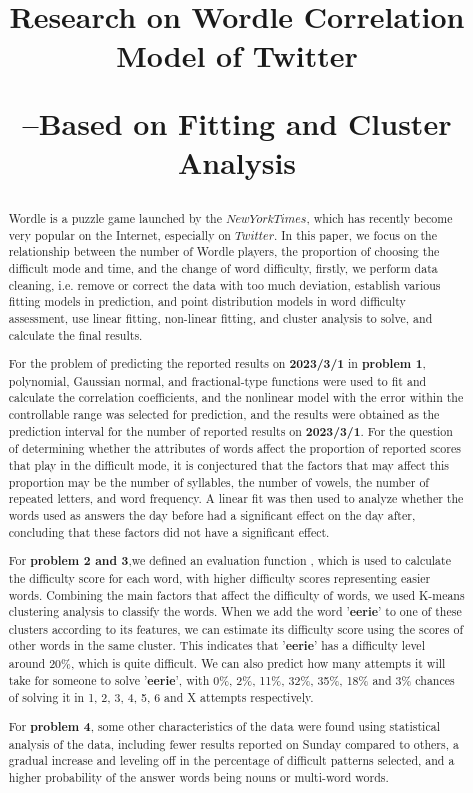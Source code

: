 \documentclass[12pt]{article}  %
\title{Research on Wordle Correlation Model of Twitter\par --Based on Fitting and Cluster Analysis}  %
\begin{document}
\begin{abstract}

Wordle is a puzzle game launched by the $New York Times$, which has recently become very popular on the Internet, especially on $Twitter$. In this paper, we focus on the relationship between the number of Wordle players, the proportion of choosing the difficult mode and time, and the change of word difficulty, firstly, we perform data cleaning, i.e. remove or correct the data with too much deviation, establish various fitting models in prediction, and point distribution models in word difficulty assessment, use linear fitting, non-linear fitting, and cluster analysis to solve, and calculate the final results.

For the problem of predicting the reported results on \textbf{2023/3/1} in \textbf{problem 1}, polynomial, Gaussian normal, and fractional-type functions were used to fit and calculate the correlation coefficients, and the nonlinear model with the error within the controllable range was selected for prediction, and the results were obtained as the prediction interval for the number of reported results on \textbf{2023/3/1}. For the question of determining whether the attributes of words affect the proportion of reported scores that play in the difficult mode, it is conjectured that the factors that may affect this proportion may be the number of syllables, the number of vowels, the number of repeated letters, and word frequency. A linear fit was then used to analyze whether the words used as answers the day before had a significant effect on the day after, concluding that these factors did not have a significant effect.

For \textbf{problem 2 and 3},we defined an evaluation function , which is used to calculate the difficulty score for each word, with higher difficulty scores representing easier words. Combining the main factors that affect the difficulty of words, we used K-means clustering analysis to classify the words. When we add the word '\textbf{eerie}' to one of these clusters according to its features, we can estimate its difficulty score using the scores of other words in the same cluster. This indicates that '\textbf{eerie}' has a difficulty level around 20\%, which is quite difficult. We can also predict how many attempts it will take for someone to solve '\textbf{eerie}', with 0\%, 2\%, 11\%, 32\%, 35\%, 18\% and 3\% chances of solving it in 1, 2, 3, 4, 5, 6 and X attempts respectively.

For \textbf{problem 4}, some other characteristics of the data were found using statistical analysis of the data, including fewer results reported on Sunday compared to others, a gradual increase and leveling off in the percentage of difficult patterns selected, and a higher probability of the answer words being nouns or multi-word words.


\end{abstract}
\end{document}
